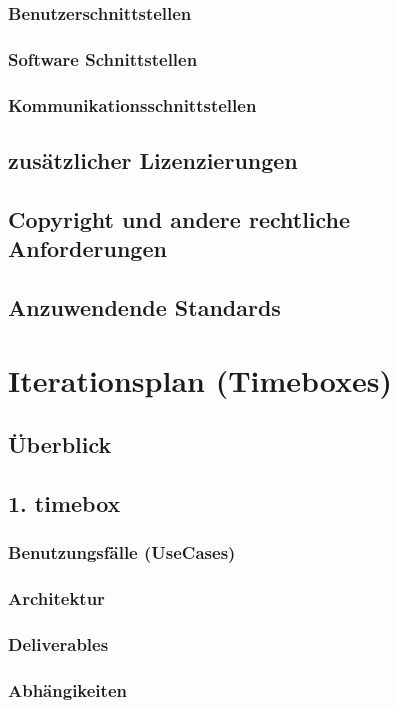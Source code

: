 \documentclass{article}
\begin{document}
\subsubsection{Benutzerschnittstellen}
\subsubsection{Software Schnittstellen}
\subsubsection{Kommunikationsschnittstellen}
\subsection{zusätzlicher Lizenzierungen}
\subsection{Copyright und andere rechtliche Anforderungen}
\subsection{Anzuwendende Standards}

\section{Iterationsplan (Timeboxes)}
\subsection{Überblick}
\subsection{1. timebox}
\subsubsection{Benutzungsfälle (UseCases)}
\subsubsection{Architektur}
\subsubsection{Deliverables}
\subsubsection{Abhängikeiten}
\end{document}
